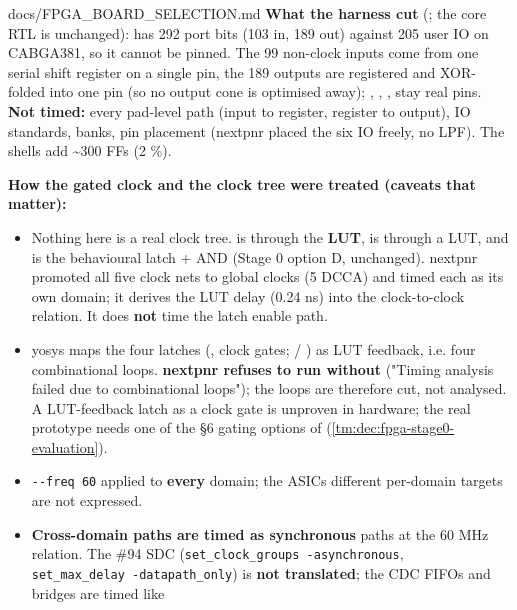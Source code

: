 \begin{relocated}{docs/FPGA_BOARD_SELECTION.md}
\textbf{What the harness cut} (;
the core RTL is unchanged):  has 292 port bits (103 in,
189 out) against 205 user IO on CABGA381, so it cannot be pinned. The 99
non-clock inputs come from one serial shift register on a single pin,
the 189 outputs are registered and XOR-folded into one pin (so no output
cone is optimised away); , ,
,  stay real pins. \textbf{Not timed:}
every pad-level path (input to register, register to output), IO
standards, banks, pin placement (nextpnr placed the six IO freely, no
LPF). The shells add \textasciitilde300 FFs (2 \%).

\textbf{How the gated clock and the clock tree were treated (caveats
that matter):}

\begin{itemize}
\tightlist
\item
  Nothing here is a real clock tree.  is 
  through the  \textbf{LUT},  is
   through a LUT, and  is the
  behavioural latch + AND  (Stage 0 option D,
  unchanged). nextpnr promoted all five clock nets to global clocks (5
  DCCA) and timed each as its own domain; it derives the LUT delay (0.24
  ns) into the clock-to-clock relation. It does \textbf{not} time the
  latch enable path.
\item
  yosys maps the four latches (,  clock
  gates;   / ) as LUT
  feedback, i.e. four combinational loops. \textbf{nextpnr refuses to
  run without } ("Timing analysis failed due to
  combinational loops"); the loops are therefore cut, not analysed. A
  LUT-feedback latch as a clock gate is unproven in hardware; the real
  prototype needs one of the §6 gating options of
   (\cref{tm:dec:fpga-stage0-evaluation}).
\item
  \texttt{-\allowbreak{}-\allowbreak{}freq\ 60} applied to
  \textbf{every} domain; the ASIC\textquotesingle s different per-domain
  targets are not expressed.
\item
  \textbf{Cross-domain paths are timed as synchronous} paths at the 60
  MHz relation. The \#94 SDC
  (\texttt{set\_\allowbreak{}clock\_\allowbreak{}groups\ -\allowbreak{}asynchronous},
  \texttt{set\_\allowbreak{}max\_\allowbreak{}delay\ -\allowbreak{}datapath\_\allowbreak{}only})
  is \textbf{not translated}; the CDC FIFOs and bridges are timed like

\end{itemize}
\end{relocated}
